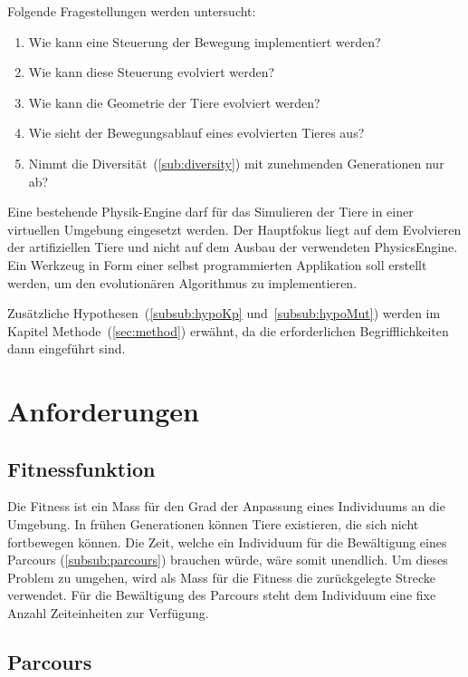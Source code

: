     Folgende Fragestellungen werden untersucht:
    \begin{enumerate}
      \item \label{item:frageSteuerungBeine} Wie kann eine Steuerung der Bewegung implementiert werden?
      \item Wie kann diese Steuerung evolviert werden?
      \item Wie kann die Geometrie der Tiere evolviert werden?
      \item Wie sieht der Bewegungsablauf eines evolvierten Tieres aus?
      \item Nimmt die Diversität~(\vref{sub:diversity}) mit zunehmenden Generationen nur ab?

    \end{enumerate}
    Eine bestehende Physik-Engine darf für das Simulieren der Tiere in einer virtuellen Umgebung eingesetzt werden.
    Der Hauptfokus liegt auf dem Evolvieren der artifiziellen Tiere und nicht auf dem Ausbau der verwendeten \gls{PhysicsEngine}.
    Ein Werkzeug in Form einer selbst programmierten Applikation soll erstellt werden, um den evolutionären Algorithmus zu implementieren.

    Zusätzliche Hypothesen~(\vref{subsub:hypoKp} und~\vref{subsub:hypoMut}) werden im Kapitel Methode~(\vref{sec:method}) erwähnt,
    da die erforderlichen Begrifflichkeiten dann eingeführt sind.


  \section{Anforderungen}

    \subsection{Fitnessfunktion}

      Die Fitness ist ein Mass für den Grad der Anpassung eines Individuums an die Umgebung.
      In frühen Generationen können Tiere existieren, die sich nicht fortbewegen können.
      Die Zeit, welche ein Individuum für die Bewältigung eines Parcours (\vref{subsub:parcours}) brauchen würde,
      wäre somit unendlich.
      Um dieses Problem zu umgehen, wird als Mass für die Fitness die zurückgelegte Strecke verwendet.
      Für die Bewältigung des Parcours steht dem Individuum eine fixe Anzahl Zeiteinheiten zur Verfügung.

    \subsection{Parcours\label{subsub:parcours}}

